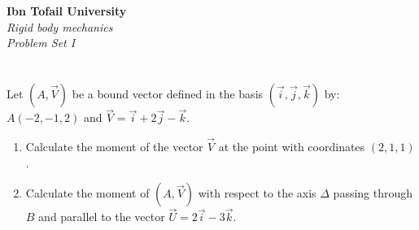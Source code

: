 \documentclass[12pt]{article}
\begin{document}
\begin{center}
\Large\textbf{Ibn Tofail University} \\[1em]
\large\textit{Rigid body mechanics} \\[2em]
\large\textit{Problem Set I} \\[0.5em]
\end{center}

\vspace{1cm}
\section{}
Let $(A, \vec{V})$ be a bound vector defined in the basis $(\vec{i}, \vec{j}, \vec{k})$ by: $A(-2, -1, 2)$ and $\vec{V} = \vec{i} + 2\vec{j} - \vec{k}$.

\begin{enumerate}
    \item Calculate the moment of the vector $\vec{V}$ at the point with coordinates $(2, 1, 1)$.
    \item Calculate the moment of $(A, \vec{V})$ with respect to the axis $\Delta$ passing through $B$ and parallel to the vector $\vec{U} = 2\vec{i} - 3\vec{k}$.
\end{enumerate}
\end{document}
